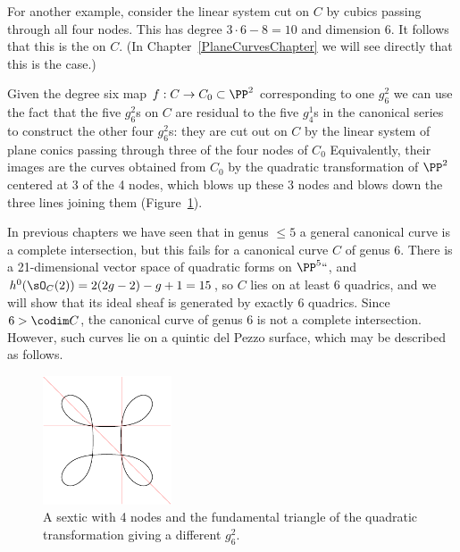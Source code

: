 For another example, consider the linear system cut on $C$ by cubics
passing through all four nodes. This has degree $3\cdot 6 - 8 = 10$
and dimension 6. It follows that this is the 
%
on $C$. (In Chapter~\ref{PlaneCurvesChapter} we will see directly that
this is the case.)

Given the degree six map $f : C \to C_0 \subset \PP^2$ corresponding
to one $g^2_6$ we can use the fact that the five $g^2_6$s on $C$ are
residual to the five $g^1_4$s in the canonical series to construct the
other four $g^2_6$s: they are cut out on $C$ by the linear system of plane
conics passing through three of the four nodes of $C_0$  Equivalently,
their images are the curves obtained from $C_{0}$ by the quadratic
transformation
of $\PP^{2}$ centered at 3 of the 4 nodes, which blows up these 3 nodes
and blows down the three lines
 joining them (Figure~\ref{plane sextics 3}).

 In previous chapters we have seen that in genus $\leq 5$ a general
 canonical curve is  a complete intersection, but this fails for a
%
 canonical curve $C$ of genus 6. There is a 21-dimensional vector space of
quadratic forms on $\PP^5` `$, and $h^0(\sO_C(2)) = 2(2g-2)-g+1 = 15$,
so $C$ lies on at least 6 quadrics, and we will show that its ideal sheaf
is generated by exactly 6 quadrics. Since $6>\codim C$, the canonical
curve of genus 6 is not a complete intersection. However, such curves
lie on a quintic del Pezzo surface, which may be described as follows.


\begin{figure}
\centerline {\includegraphics[height=1.5in,trim=10 10 10 10,clip]{main/Fig11-4-new}}
\caption{A sextic with 4 nodes and the fundamental triangle of the
quadratic transformation giving
a different $g^{2}_{6}$.\qquad\qquad
{}}
  \label{plane sextics 3}
\end{figure}


